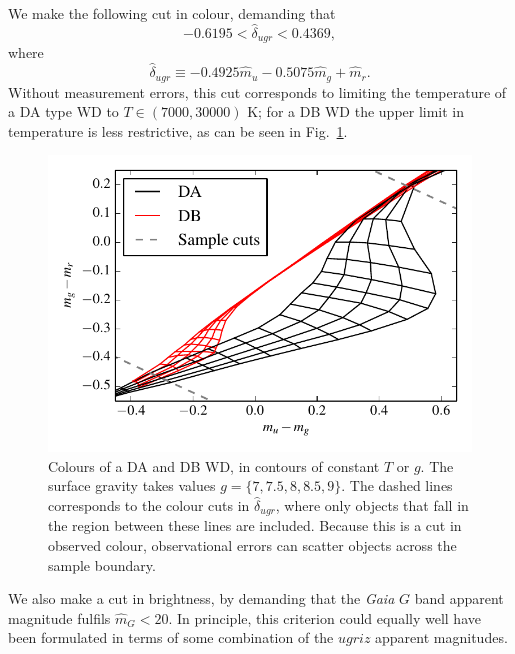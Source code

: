 \documentclass[fleqn,usenatbib]{mnras}
\newcommand{\Teff}{T}
\newcommand{\logg}{g}
\begin{document}
We make the following cut in colour, demanding that
\begin{equation}
	-0.6195 < \hat{\delta}_{ugr} < 0.4369,
\end{equation}
where
\begin{equation}
	\hat{\delta}_{ugr} \equiv -0.4925\hat{m}_u-0.5075\hat{m}_g+\hat{m}_r.
\end{equation}
Without measurement errors, this cut corresponds to limiting the temperature of a DA type WD to $\Teff \in (7000,30000)$ K; for a DB WD the upper limit in temperature is less restrictive, as can be seen in Fig.~\ref{fig:colors_cut}.

\begin{figure}
	\includegraphics[width=\columnwidth]{colors_cut.pdf}
    \caption{Colours of a DA and DB WD, in contours of constant $\Teff$ or $\logg$. The surface gravity takes values $\logg = \{7,7.5,8,8.5,9\}$. The dashed lines corresponds to the colour cuts in $\hat{\delta}_{ugr}$, where only objects that fall in the region between these lines are included. Because this is a cut in observed colour, observational errors can scatter objects across the sample boundary.}
    \label{fig:colors_cut}
\end{figure}

We also make a cut in brightness, by demanding that the \emph{Gaia} $G$ band apparent magnitude fulfils $\hat{m}_G < 20$. In principle, this criterion could equally well have been formulated in terms of some combination of the $ugriz$ apparent magnitudes.
\end{document}
